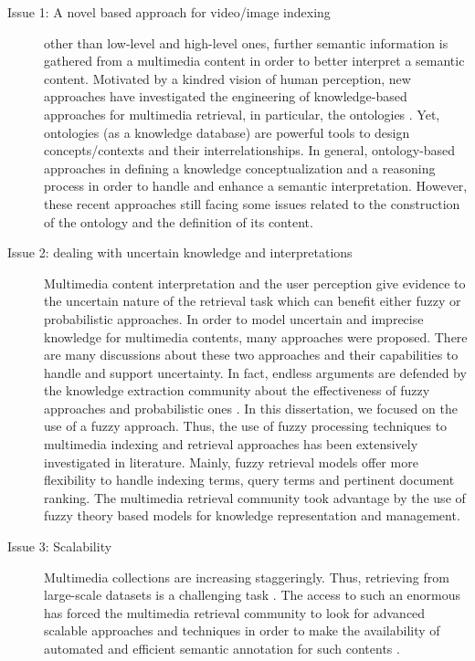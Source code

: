 	
	\begin{description}
		\item[Issue 1: A novel  based approach for video/image indexing]
		other than low-level and high-level ones, further semantic information is gathered 
	from a multimedia content in order to better interpret a semantic content. Motivated by a kindred vision 
	of human perception, new approaches have investigated the engineering of knowledge-based approaches 
	for multimedia retrieval, in particular, the ontologies 
	\citep{Mylonas2008,Hudelot2008,Mylonas2009,Elleuch2011,Paliouras2011,Bannour2014}.
	Yet, ontologies \citep{Petridis2004,Wallace2005,Moeller2008,Dou2015}
	(as a knowledge database) are powerful tools to design concepts/contexts 	
	and their interrelationships. In general, ontology-based approaches 
	 in defining a knowledge conceptualization and a reasoning process in order to handle and 
	enhance a semantic interpretation. However, these recent approaches 
	still facing some issues related to the construction of the ontology and the definition of its content.

		\item[Issue 2: dealing with uncertain knowledge and interpretations]
	Multimedia content interpretation and the user perception give evidence to the uncertain nature of the retrieval
	task which can benefit  either fuzzy or probabilistic approaches. In order to model uncertain and 
	imprecise knowledge for multimedia contents, many approaches were proposed. There are many discussions
	about these two approaches and their capabilities to handle and support uncertainty.
	In fact, endless arguments are defended by the knowledge extraction community about  the effectiveness 
	of fuzzy approaches and probabilistic ones \citep{Gaines1978,Bosko1990,Sanjaa2007,Zadeh2014,Zadeh2015}. 
	In this dissertation, we focused on the use of a fuzzy approach. Thus, the use of fuzzy 
	processing techniques to multimedia indexing and retrieval approaches has been extensively investigated 
	in literature. Mainly, fuzzy retrieval models offer more flexibility to handle indexing terms, query 
	terms and pertinent document ranking. The multimedia retrieval community took advantage by the use of 
	fuzzy theory based models for knowledge representation and management.

		\item[Issue 3: Scalability]
	Multimedia collections are increasing staggeringly. Thus, retrieving from large-scale datasets 
	is a challenging task \citep{Villegas2013,Villegas2014,Gilbert2015,Villegas2015}.
	The access to such an enormous  has forced the multimedia retrieval community to look for advanced scalable
	approaches and techniques in order to make the availability of automated and efficient semantic 
	annotation for such contents \citep{Wang2011,Zhang2012,Benavent2013,Sahbi2013,Reshma2014}.
	
	\end{description}
	

